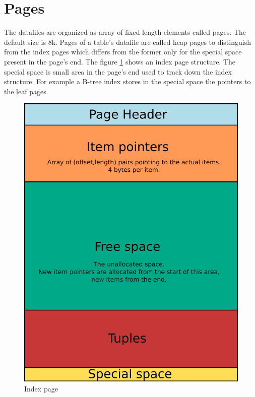 \section{Pages}
The datafiles are organized as array of fixed length elements called pages. The 
default size is 8k. Pages of a table's datafile are called heap 
pages to distinguish from the index pages 
which differs from the former only for the special space present in the page's 
end. The figure \ref{fig:INDEX01} shows an index page structure. The special 
space is small area in the page's end used to track down the index structure. 
For example a B-tree index stores in the special space the pointers to the leaf 
pages.

\begin{figure}[H]
\begin{center}

\includegraphics[scale=0.35]{images/index_page_01}

\caption{Index page}
\label{fig:INDEX01} 
\end{center}

\end{figure}

